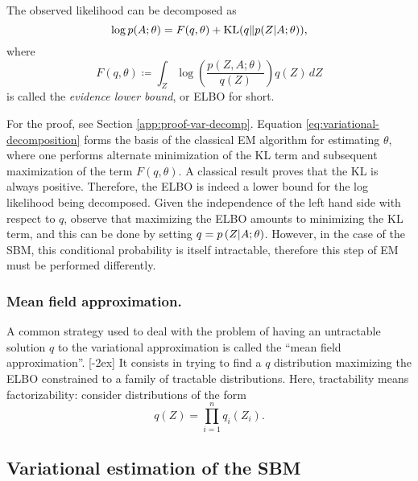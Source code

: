 \documentclass[../../main.tex]{subfiles} %
\begin{document}
\begin{theorem} \label{thm:var-decomp}
	The observed likelihood can be decomposed as
	\begin{equation}
		\log p (A; \theta) = F (q, \theta) + \operatorname{KL} (q \Vert p( Z \vert 
		A; \theta)),
		\label{eq:variational-decomposition}
	\end{equation}
	where
	\begin{equation}
		F (q, \theta) \coloneqq \int_{Z} \log \left(
		\frac{p \left( Z, A; \theta \right)}{q(Z)} \right) q(Z) \, dZ
	\end{equation}
	is called the \textit{evidence lower bound}, or ELBO for short.
\end{theorem}

For the proof, see Section \ref{app:proof-var-decomp}. Equation 
\eqref{eq:variational-decomposition} forms the basis of the classical 
EM algorithm for estimating \(\theta\), where one performs alternate 
minimization of the KL term and subsequent maximization of the term 
\(F \left( q, \theta \right)\). 
A classical result proves that the KL is always positive. Therefore, the ELBO 
is indeed a lower bound for the log likelihood being decomposed. 
Given the independence of the left hand side with respect to $q$, observe that 
maximizing the ELBO amounts to minimizing the KL term, and this can be done by 
setting \(q = p \left(Z \vert A; \theta \right)\). However, in the case of the SBM, this 
conditional probability is itself intractable, therefore this step of EM must 
be performed differently.

\subsubsection{Mean field approximation.} A 
common strategy used to deal with the 
problem of having an untractable solution \(q\) to the variational 
approximation is called the ``mean field approximation''. [-2ex] It consists in trying to find a \(q\) 
distribution maximizing the ELBO constrained to a family of tractable 
distributions. Here, tractability means factorizability: consider distributions 
of the form
\begin{equation*}
	q \left( Z \right) = \prod_{i=1}^{n} q_i \left( Z_i \right).
\end{equation*}

\subsection{Variational estimation of the SBM} 
\label{sec:var-estimation-sbm}
\end{document}
